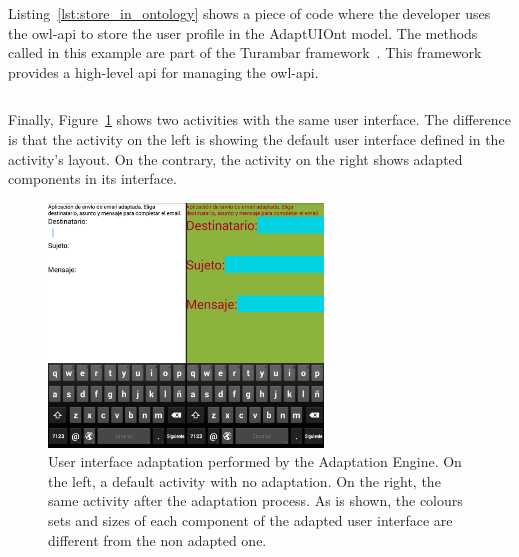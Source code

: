\inputminted[linenos=true, fontsize=\footnotesize, frame=lines]{java}{4_system_architecture/abstract_activity.java}

Listing~\ref{lst:store_in_ontology} shows a piece of code where the developer
uses the \ac{owl}-\ac{api} to store the user profile in the AdaptUIOnt model. 
The methods called in this example are part of the Turambar framework~\citep{david_ausin_probabilistic_2014}. 
This framework provides a high-level \ac{api} for managing the \ac{owl}-\ac{api}.

\inputminted[linenos=true, fontsize=\footnotesize, frame=lines]{java}{4_system_architecture/store_in_ontology.java}


Finally, Figure~\ref{fig:adaptation_differences} shows two activities with the
same user interface. The difference is that the activity on the left is showing
the default user interface defined in the activity's layout. On the contrary,
the activity on the right shows adapted components in its interface.

\begin{figure}[H]
\centering
\includegraphics[width=0.65\textwidth]{adaptation_differences.png}
\caption{User interface adaptation performed by the Adaptation Engine. On the
left, a default activity with no adaptation. On the right, the same activity
after the adaptation process. As is shown, the colours sets and sizes of each
component of the adapted user interface are different from the non adapted one.}
\label{fig:adaptation_differences}
\end{figure}


